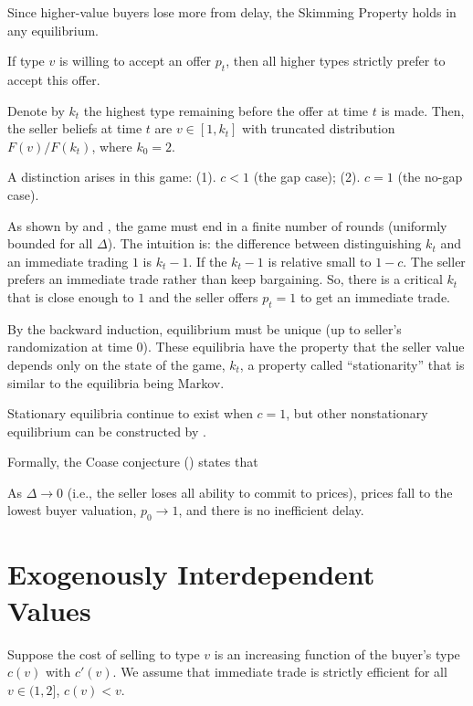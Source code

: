 \documentclass[11pt]{elegantbook}
\begin{document}
Since higher-value buyers lose more from delay, the Skimming Property holds in any equilibrium.
\begin{lemma}
    If type $v$ is willing to accept an offer $p_t$, then all higher types strictly prefer to accept this offer.
\end{lemma}
Denote by $k_t$ the highest type remaining before the offer at time $t$ is made. Then, the seller beliefs at time $t$ are $v\in[1,k_t]$ with truncated distribution $F(v)/F(k_t)$, where $k_0=2$.


A distinction arises in this game: (1). $c<1$ (the gap case); (2). $c=1$ (the no-gap case).

As shown by \cite{fudenberg1985infinite} and \cite{gul1986foundations}, the game must end in a finite number of rounds (uniformly bounded for all $\Delta$). The intuition is: the difference between distinguishing $k_t$ and an immediate trading $1$ is $k_t-1$. If the $k_t-1$ is relative small to $1-c$. The seller prefers an immediate trade rather than keep bargaining. So, there is a critical $k_t$ that is close enough to $1$ and the seller offers $p_t=1$ to get an immediate trade.

By the backward induction, equilibrium must be unique (up to seller's randomization at time $0$). These equilibria have the property that the seller value depends only on the state of the game, $k_t$, a property called ``stationarity'' that is similar to the equilibria being Markov.

Stationary equilibria continue to exist when $c = 1$, but other nonstationary equilibrium can be constructed by \cite{ausubel1989reputation}.

Formally, the Coase conjecture (\cite{coase1972durability}) states that
\begin{proposition}
    As $\Delta \rightarrow 0$ (i.e., the seller loses all ability to commit to prices), prices fall to the lowest buyer valuation, $p_0 \rightarrow 1$, and there is no inefficient delay.
\end{proposition}


\section{Exogenously Interdependent Values}
Suppose the cost of selling to type $v$ is an increasing function of the buyer's type $c(v)$ with $c'(v)$. We assume that immediate trade is strictly efficient for all $v\in (1,2]$, $c(v)<v$.
\end{document}
